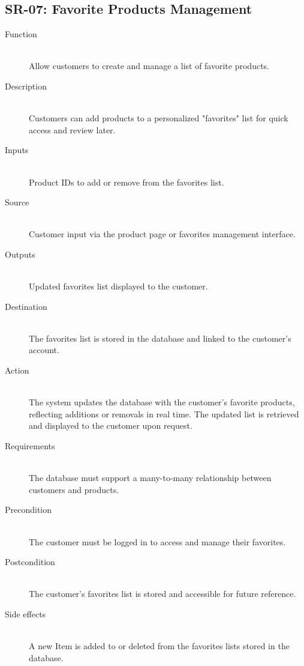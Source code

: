 \documentclass[a4paper,journal]{IEEEtran}
\begin{document}
\subsection{SR-07: Favorite Products Management}
\begin{description}
  \item[Function] \hfill \\
  Allow customers to
  create and manage a list of favorite products.
  \item[Description] \hfill \\
  Customers can add products to a personalized
  "favorites" list for quick access and review later.
  \item[Inputs] \hfill \\
  Product IDs to add or remove from the favorites list.
  \item[Source] \hfill \\
  Customer input via the product page or favorites
  management interface.
  \item[Outputs] \hfill \\
  Updated favorites list displayed to the customer.
  \item[Destination] \hfill \\
  The favorites list is stored in the database and
  linked to the customer's account.
  \item[Action] \hfill \\
  The system updates the database with the customer's
  favorite products, reflecting additions or removals in real time. The updated
  list is retrieved and displayed to the customer upon request.
  \item[Requirements] \hfill \\
  The database must support a many-to-many relationship
  between customers and products.
  \item[Precondition] \hfill \\
  The customer must be logged in to access and manage
  their favorites.
  \item[Postcondition] \hfill \\
  The customer's favorites list is stored and
  accessible for future reference.
  \item[Side effects] \hfill \\
  A new Item is added to or deleted from the favorites
  lists stored in the database.
\end{description}
\end{document}
